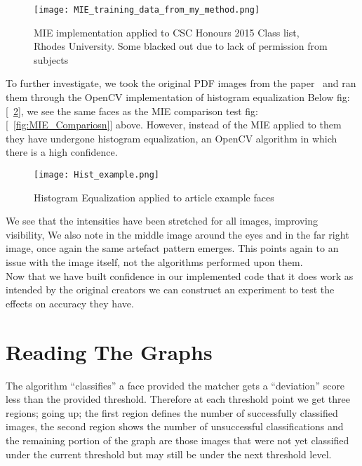 		\begin{figure}[H]
			\centering
			\caption{MIE implementation applied to CSC Honours 2015 Class list, Rhodes University. Some blacked out due to lack of permission from subjects\label{fig:MIE_training_data_from_my_method}}
			\texttt{[image: MIE\_training\_data\_from\_my\_method.png]}
		\end{figure}
	
	To further investigate, we took the original PDF images from the paper~\cite{LuoaRINMBoMEfFR} and ran them through the OpenCV implementation 
	of histogram equalization Below fig:[~\ref{fig:Hist_example}], we see the same faces as the MIE comparison test 
	fig:[~\ref{fig:MIE_Compariosn}] above.  However, instead of the MIE applied to them they have undergone histogram 
	equalization, an OpenCV algorithm in which there is a high confidence.

		\begin{figure}[H]
			\centering
			\caption{Histogram Equalization applied to article example faces~\cite{LuoaRINMBoMEfFR} \label{fig:Hist_example}}
			\texttt{[image: Hist\_example.png]}
		\end{figure}
		
	We see that the intensities have been stretched for all images, improving visibility, We also note in the middle 
	image around the eyes and in the far right image, once again the same artefact pattern emerges.  This points again 
	to an issue with the image itself, not the algorithms performed upon them.  \\
	
	Now that we have built confidence in our implemented code that it does work as intended by the original creators 
	we can construct an experiment to test the effects on accuracy they have.
	
\section{Reading The Graphs}
The algorithm ``classifies'' a face provided the matcher gets a ``deviation'' score less than the provided threshold.   Therefore 
at each threshold point we get three regions; going up; the first region defines the number of successfully classified images, 
the second region shows the number of unsuccessful classifications and the remaining portion of the graph are those images that 
were not yet classified under the current threshold but may still be under the next threshold level. 

